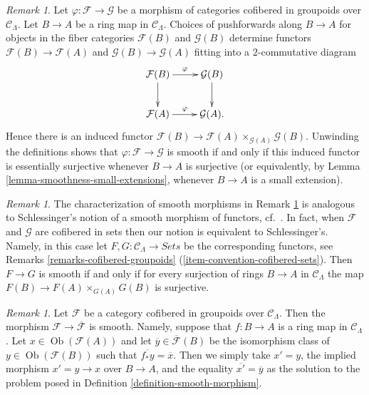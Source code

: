 \documentclass{stacks-project}
\theoremstyle{plain}
\theoremstyle{definition}
\theoremstyle{remark}
\newtheorem{remark}[subsection]{Remark}
\numberwithin{equation}{subsection}
\def\Ob{\mathop{\mathrm{Ob}}\nolimits}
\begin{document}
\begin{remark}
\label{remark-smoothness-2-categorical}
Let $\varphi : \mathcal{F} \to \mathcal{G}$ be a morphism of categories
cofibered in groupoids over $\mathcal{C}_\Lambda$.  Let $B \to A$ be a
ring map in $\mathcal{C}_\Lambda$.  Choices of pushforwards along $B
\to A$ for objects in the fiber categories $\mathcal{F}(B)$ and
$\mathcal{G}(B)$ determine functors $\mathcal{F}(B) \to \mathcal{F}(A)$
and $\mathcal{G}(B) \to \mathcal{G}(A)$ fitting into a $2$-commutative
diagram
$$
\xymatrix{
\mathcal{F}(B) \ar[r]^{\varphi} \ar[d] & \mathcal{G}(B) \ar[d] \\
\mathcal{F}(A) \ar[r]^{\varphi}        & \mathcal{G}(A) .
}
$$
Hence there is an induced functor $\mathcal{F}(B) \to \mathcal{F}(A)
\times_{\mathcal{G}(A)} \mathcal{G}(B)$.  Unwinding the definitions shows that
$\varphi : \mathcal{F} \to \mathcal{G}$ is smooth if and only if this
induced functor is essentially surjective whenever $B \to A$ is
surjective (or equivalently, by
Lemma \ref{lemma-smoothness-small-extensions},
whenever $B \to A$ is a small extension).
\end{remark}

\begin{remark}
\label{remark-compare-smooth-schlessinger}
The characterization of smooth morphisms in
Remark \ref{remark-smoothness-2-categorical}
is analogous to Schlessinger's notion of
a smooth morphism of functors, cf.\ \cite[Definition 2.2.]{Sch}. In
fact, when $\mathcal{F}$ and $\mathcal{G}$ are cofibered in sets
then our notion is equivalent to Schlessinger's. Namely, in this case
let $F, G : \mathcal{C}_\Lambda \to \textit{Sets}$ be the corresponding
functors, see
Remarks \ref{remarks-cofibered-groupoids}
(\ref{item-convention-cofibered-sets}).
Then $F \to G$ is smooth if and only if for every surjection of rings
$B \to A$ in $\mathcal{C}_\Lambda$ the map $F(B) \to F(A) \times_{G(A)} G(B)$
is surjective.
\end{remark}

\begin{remark}
\label{remark-smooth-to-iso-classes}
Let $\mathcal{F}$ be a category cofibered in groupoids over
$\mathcal{C}_\Lambda$. Then the morphism
$\mathcal{F} \to \overline{\mathcal{F}}$ is smooth.
Namely, suppose that $f : B \to A$ is a ring map in $\mathcal{C}_\Lambda$.
Let $x \in \Ob(\mathcal{F}(A))$ and let
$\overline{y} \in \overline{\mathcal{F}}(B)$
be the isomorphism class of $y \in \Ob(\mathcal{F}(B))$ such that
$\overline{f_*y} = \overline{x}$. Then we simply take $x' = y$, the
implied morphism $x' = y \to x$ over $B \to A$, and the equality
$\overline{x'} = \overline{y}$ as the solution to
the problem posed in Definition \ref{definition-smooth-morphism}.
\end{remark}
\end{document}
